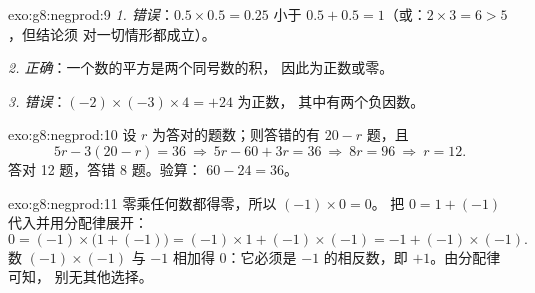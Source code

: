 \begin{solution}{exo:g8:negprod:9}
\emph{1. 错误}：$0.5 \times 0.5 = 0.25$ 小于
$0.5 + 0.5 = 1$（或：$2 \times 3 = 6 > 5$，但结论须
对一切情形都成立）。

\emph{2. 正确}：一个数的平方是两个同号数的积，
因此为正数或零。

\emph{3. 错误}：$(-2) \times (-3) \times 4 = +24$ 为正数，
其中有两个负因数。
\end{solution}

\begin{solution}{exo:g8:negprod:10}
设 $r$ 为答对的题数；则答错的有 $20 - r$ 题，且
\[
5r - 3(20 - r) = 36
\ \Longrightarrow\
5r - 60 + 3r = 36
\ \Longrightarrow\
8r = 96
\ \Longrightarrow\
r = 12 .
\]
答对 12 题，答错 8 题。验算：
$60 - 24 = 36$。
\end{solution}

\begin{solution}{exo:g8:negprod:11}
零乘任何数都得零，所以 $(-1) \times 0 = 0$。
把 $0 = 1 + (-1)$ 代入并用分配律展开：
\[
0 = (-1) \times \bigl(1 + (-1)\bigr)
= (-1) \times 1 + (-1) \times (-1)
= -1 + (-1) \times (-1).
\]
数 $(-1) \times (-1)$ 与 $-1$ 相加得 $0$：它必须是
$-1$ 的相反数，即 $+1$。由分配律可知，
别无其他选择。
\end{solution}

